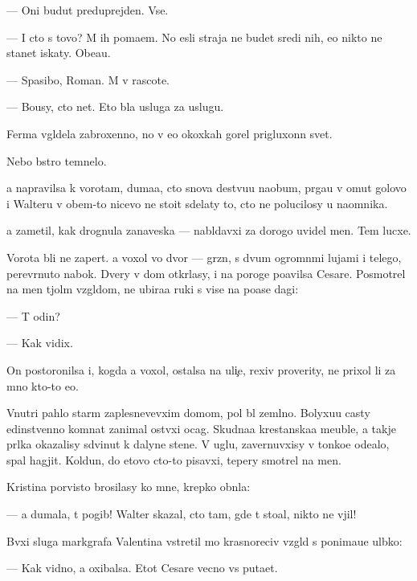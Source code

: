 \documentclass[10pt]{book}
\begin{document}
— Oni budut preduprejden{\yi}. Vse.

— I cto s tovo? M{\yi} ih po{\y}ma{\y}em. No {\y}esli straja ne budet sredi nih, {\y}e{\y}o nikto ne stanet iskaty. Obe{\x}a{\y}u.

— Spasibo, Roman. M{\yi} v rascote.

— Bo{\y}usy, cto net. Eto b{\yi}la usluga za uslugu.



Ferma v{\yi}gl{\ia}dela zabroxenno{\y}, no v {\y}e{\y}o okoxkah gorel prigluxonn{\yi}{\y} svet.

Nebo b{\yi}stro temnelo.

{\Y}a napravilsa k vorotam, duma{\y}a, cto snova de{\y}stvu{\y}u naobum, pr{\yi}ga{\y}u v omut golovo{\y} i Walteru v ob{\x}em-to nicevo ne stoit sdelaty to, cto ne polucilosy u na{\y}omnika.

{\Y}a zametil, kak drognula zanaveska — nabl{\io}davxi{\y} za dorogo{\y} uvidel men{\ia}. Tem lucxe.

Vorota b{\yi}li ne zapert{\yi}. {\Y}a  voxol vo dvor — gr{\ia}zn{\yi}{\y}, s dvum{\ia} ogromn{\yi}mi lujami i telego{\y}, perev{\e}rnuto{\y} nabok. Dvery v dom otkr{\yi}lasy, i na poroge po{\y}avilsa Cesare. Posmotrel na men{\ia} t{\ia}jol{\yi}m vzgl{\ia}dom, ne ubira{\y}a ruki s vis{\ia}{\x}e{\y} na po{\y}ase dagi:

— T{\yi} odin?

— Kak vidix.

On postoronilsa i, kogda {\y}a  voxol, ostalsa na uli{\c}e, rexiv proverity, ne prixol li za mno{\y} kto-to {\y}e{\x}o.

Vnutri pahlo star{\yi}m zaplesnevevxim domom, pol b{\yi}l zeml{\ia}no{\y}. Bolyxu{\y}u casty {\y}edinstvenno{\y} komnat{\yi} zanimal ost{\yi}vxi{\y} ocag. Skudna{\y}a krest{\y}anska{\y}a meuble, a takje pr{\ia}lka okazalisy sdvinut{\yi} k dalyne{\y} stene. V uglu, zavernuvxisy v tonko{\y}e ode{\y}alo, spal hagjit. Koldun, do etovo cto-to pisavxi{\y}, tepery smotrel na men{\ia}.

Kristina por{\yi}visto brosilasy ko mne, krepko obn{\ia}la:

— {\Y}a dumala, t{\yi} pogib! Walter skazal, cto tam, gde t{\yi} sto{\y}al, nikto ne v{\yi}jil!

B{\yi}vxi{\y} sluga markgrafa Valentina vstretil mo{\y} krasnoreciv{\yi}{\y} vzgl{\ia}d s ponima{\y}u{\x}e{\y} ul{\yi}bko{\y}:

— Kak vidno, {\y}a oxibalsa. Etot Cesare vecno vs{\e} puta{\y}et.
\end{document}
